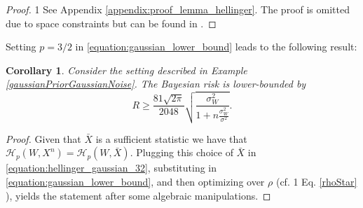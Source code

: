 \documentclass[conference]{IEEEtran}
\theoremstyle{plain}
\newtheorem{corollary}{Corollary}
\theoremstyle{definition}
\theoremstyle{remark}
\def\arxiv{1}
\begin{document}
\begin{proof}
\if\arxiv1
    See Appendix \ref{appendix:proof_lemma_hellinger}.
\else 
    The proof is omitted due to space constraints but can be found in \cite[Appendix C]{arxiv_version_of_this_paper}.
\fi
\end{proof}
Setting $p=3/2$ in \eqref{equation:gaussian_lower_bound} leads to the following result:
\begin{corollary}\label{corollary:gaussian_lower_bound_closed_form}
Consider the setting described in Example \ref{gaussianPriorGaussianNoise}. The Bayesian risk is lower-bounded by
\begin{equation}\label{equation:gaussian_lower_bound_closed_form}
    R \geq \frac{81\sqrt{2\pi}}{2048}\sqrt{\frac{\sigma_W^2}{1+n\frac{\sigma_W^2}{\sigma^2}}}.
\end{equation}
\end{corollary}
\begin{proof} 
Given that $\bar{X}$ is a sufficient statistic we have that $\mathcal{H}_p(W,X^n) = \mathcal{H}_p(W,\bar{X})$. %
Plugging this choice of $\bar{X}$ in \eqref{equation:hellinger_gaussian_32}, substituting in \eqref{equation:gaussian_lower_bound}, and then optimizing over $\rho$ (cf. \if\arxiv1 Eq. \eqref{rhoStar} \else \cite[Eq. (45)]{arxiv_version_of_this_paper}\fi), yields the statement after some algebraic manipulations.

\end{proof}
\end{document}
